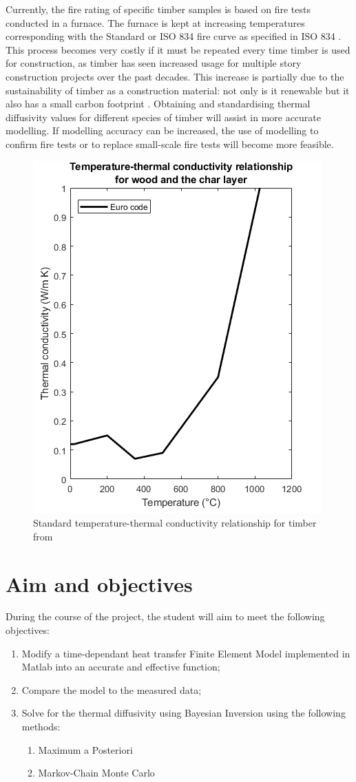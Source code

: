 Currently, the fire rating of specific timber samples is based on fire tests conducted in a furnace. 
The furnace is kept at increasing temperatures corresponding with the Standard or ISO 834 fire curve as specified in ISO 834 \citep{ISO:1999}.
This process becomes very costly if it must be repeated every time timber is used for construction, as timber has seen increased usage for multiple story construction projects over the past decades. 
This increase is partially due to the sustainability of timber as a construction material: not only is it renewable but it also has a small carbon footprint \citep{Salvadori:2017}.
Obtaining and standardising thermal diffusivity values for different species of timber will assist in more accurate modelling.
If modelling accuracy can be increased, the use of modelling to confirm fire tests or to replace small-scale fire tests will become more feasible.

	\begin{figure}
	\label{kvalue_fig}
	\centering
	\includegraphics[width = 0.5\linewidth]{figures/Eurok.png}
	\caption{Standard temperature-thermal conductivity relationship for timber from \citep{Euro:2004}}
	\end{figure}
	
	

\section{Aim and objectives}
During the course of the project, the student will aim to meet the following objectives:
\begin{enumerate}
 \item Modify a time-dependant heat transfer Finite Element Model implemented in Matlab into an accurate and effective function;
 \item Compare the model to the measured data;
 \item Solve for the thermal diffusivity using Bayesian Inversion using the following methods:
 	\begin{enumerate}
 		\item Maximum a Posteriori
 		\item Markov-Chain Monte Carlo 	
 	\end{enumerate}
\end{enumerate}


